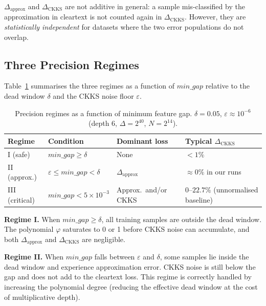 \documentclass[runningheads]{llncs}
\begin{document}
\begin{remark}
$\Delta_{\mathrm{approx}}$ and $\Delta_{\mathrm{CKKS}}$ are not additive in
general: a sample mis-classified by the approximation in cleartext is not
counted again in $\Delta_{\mathrm{CKKS}}$.  However, they are
\emph{statistically independent} for datasets where the two error populations
do not overlap.
\end{remark}

\subsection{Three Precision Regimes}
\label{sec:regimes}

Table~\ref{tab:regimes} summarises the three regimes as a function of
$\mathit{min\_gap}$ relative to the dead window $\delta$ and the CKKS noise
floor $\varepsilon$.

\begin{table}[t]
\centering
\caption{Precision regimes as a function of minimum feature gap.
$\delta = 0.05$, $\varepsilon \approx 10^{-6}$ (depth 6, $\Delta = 2^{40}$,
$N = 2^{14}$).}
\label{tab:regimes}
\begin{tabular}{@{}llll@{}}
\toprule
Regime & Condition & Dominant loss & Typical $\Delta_{\mathrm{CKKS}}$ \\
\midrule
I   (safe)    & $\mathit{min\_gap} \geq \delta$                  & None              & $< 1\%$     \\
II  (approx.) & $\varepsilon \leq \mathit{min\_gap} < \delta$    & $\Delta_{\mathrm{approx}}$ & $\approx 0\%$ in our runs \\
III (critical)& $\mathit{min\_gap} < 5 \times 10^{-3}$          & Approx.\ and/or CKKS & $0$--$22.7\%$ (unnormalised baseline) \\
\bottomrule
\end{tabular}
\end{table}

\textbf{Regime I.}  When $\mathit{min\_gap} \geq \delta$, all training
samples are outside the dead window.  The polynomial $\varphi$ saturates
to 0 or 1 before CKKS noise can accumulate, and both
$\Delta_{\mathrm{approx}}$ and $\Delta_{\mathrm{CKKS}}$ are negligible.

\textbf{Regime II.}  When $\mathit{min\_gap}$ falls between $\varepsilon$ and
$\delta$, some samples lie inside the dead window and experience
approximation error.  CKKS noise is still below the gap and does not add to
the cleartext loss.  This regime is correctly handled by increasing the
polynomial degree (reducing the effective dead window at the cost of
multiplicative depth).
\end{document}
